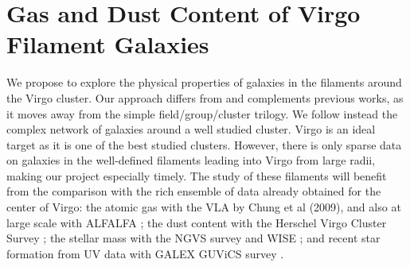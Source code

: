 \documentclass[12pt, preprint]{aastex}
\begin{document}
\vspace*{-.8cm}
\section{Gas and Dust Content of Virgo Filament Galaxies}
\vspace*{-.4cm}
We propose to explore the physical properties of
galaxies in the filaments around the Virgo cluster.   Our approach
differs from and complements previous works, as it moves away from the
simple field/group/cluster trilogy. We follow instead the complex
network of galaxies around a well studied cluster.  Virgo is an ideal
target as it is one of the best studied clusters.  However, there is
only sparse data on galaxies in the well-defined filaments leading
into Virgo from large radii, making our project especially timely.
The study of these filaments will benefit from the comparison with the rich
ensemble of data already obtained for the center of Virgo: the atomic
gas with the VLA by Chung
et al (2009), and also at large scale with ALFALFA \citep{giovanelli05}; the
dust content with the Herschel Virgo Cluster Survey \citep{davies10}; the stellar mass with the
NGVS survey and WISE \citep{ferrarese12}; and recent star formation
from UV data with GALEX GUViCS survey \citep{boselli11}. 




\end{document}
